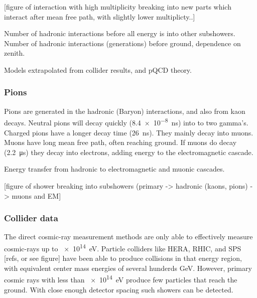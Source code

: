 [figure of interaction with high multiplicity breaking into new parts which interact after mean free path, with slightly lower multiplicty..]

Number of hadronic interactions before all energy is into other subshowers.
Number of hadronic interactions (generations) before ground, dependence on zenith.

\cite{pierog2015hadronic}

Models extrapolated from collider results, and pQCD theory.



\subsubsection{Pions}

Pions are generated in the hadronic (Baryon) interactions, and also from kaon decays. Neutral pions will decay quickly (\SI{8.4e-8}{\ns}) into to two gamma's. Charged pions have a longer decay time (\SI{26}{\ns}). They mainly decay into muons. Muons have long mean free path, often reaching ground. If muons do decay (\SI{2.2}{\micro\second}) they decay into electrons, adding energy to the electromagnetic cascade.

Energy transfer from hadronic to electromagnetic and muonic cascades.

[figure of shower breaking into subshowers (primary -> hadronic (kaons, pions) -> muons and EM]



\subsubsection{Collider data}

The direct cosmic-ray measurement methods are only able to effectively measure cosmic-rays up to \SI{e14}{\eV}. Particle colliders like HERA, RHIC, and SPS [refs, or see figure] have been able to produce collisions in that energy region, with equivalent center mass energies of several hunderds \si{\GeV}. However, primary cosmic rays with less than \SI{e14}{\eV} produce few particles that reach the ground. With close enough detector spacing such showers can be detected.

